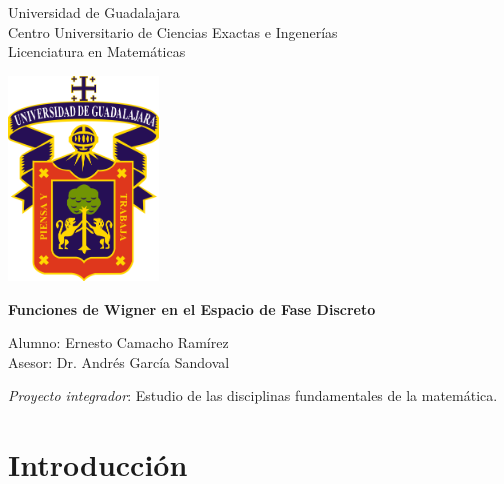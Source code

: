 \documentclass[a4paper,11pt]{report}
\begin{document}
  \begin{titlepage}
    \begin{center}
      \vspace{1.0in}

      \huge
      Universidad de Guadalajara\\
      \vspace{0.2cm}
      \large
      Centro Universitario de Ciencias Exactas e Ingenerías\\
      Licenciatura en Matemáticas\\

      \vspace{0.5in}

      \includegraphics[width=0.3\textwidth]{imgs/udg}
      
      \vspace{0.5in}

      \huge
      \textbf{
        Funciones de Wigner en el Espacio de Fase Discreto
      }

      \large
      \vspace{1.0in}
      
      Alumno: Ernesto Camacho Ramírez \\
      \vspace{0.2cm}
      Asesor: Dr. Andrés García Sandoval \\

      \vfill
           
      \textit{Proyecto integrador}: Estudio de las
      disciplinas fundamentales de la matemática.
     \end{center}
  \end{titlepage}

  \tableofcontents

  \newpage
  \section{Introducción}
\end{document}
